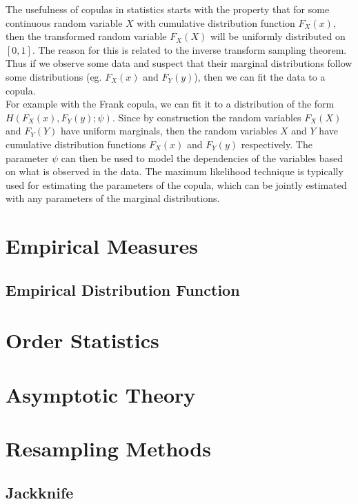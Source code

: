 \documentclass[11pt]{report} %
\begin{document}
The usefulness of copulas in statistics starts with the property that for some continuous random variable $X$ with cumulative distribution function $F_{X}\left(x\right)$, then the transformed random variable $F_{X}\left(X\right)$ will be uniformly distributed on $\left[0, 1\right]$. The reason for this is related to the inverse transform sampling theorem. Thus if we observe some data and suspect that their marginal distributions follow some distributions (eg. $F_{X}\left(x\right)$ and $F_{Y}\left(y\right)$), then we can fit the data to a copula. \\

For example with the Frank copula, we can fit it to a distribution of the form $H\left(F_{X}\left(x\right), F_{Y}\left(y\right); \psi\right)$. Since by construction the random variables $F_{X}\left(X\right)$ and $F_{Y}\left(Y\right)$ have uniform marginals, then the random variables $X$ and $Y$ have cumulative distribution functions $F_{X}\left(x\right)$ and $F_{Y}\left(y\right)$ respectively. The parameter $\psi$ can then be used to model the dependencies of the variables based on what is observed in the data. The maximum likelihood technique is typically used for estimating the parameters of the copula, which can be jointly estimated with any parameters of the marginal distributions.

\section{Empirical Measures}

\subsection{Empirical Distribution Function}

\section{Order Statistics}

\section{Asymptotic Theory}

\section{Resampling Methods}

\subsection{Jackknife}
\end{document}
